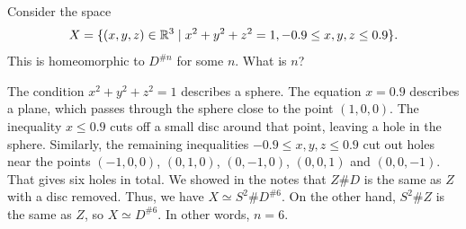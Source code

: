 \documentclass[a4paper]{amsart}
\begin{document}
\begin{exercise}
 Consider the space
 \[ X = \{(x,y,z)\in\mathbb{R}^3\;|\; x^2+y^2+z^2=1,
           -0.9 \leq x,y,z\leq 0.9\}.
 \]
 This is homeomorphic to $D^{\# n}$ for some $n$.  What is $n$?
\end{exercise}
\begin{solution}
 The condition $x^2+y^2+z^2=1$ describes a sphere.  The equation
 $x=0.9$ describes a plane, which passes through the sphere close to
 the point $(1,0,0)$.  The inequality $x\leq 0.9$ cuts off a small
 disc around that point, leaving a hole in the sphere.  Similarly, the
 remaining inequalities $-0.9\leq x,y,z\leq 0.9$ cut out holes near
 the points $(-1,0,0)$, $(0,1,0)$, $(0,-1,0)$, $(0,0,1)$ and
 $(0,0,-1)$.  That gives six holes in total.  We showed in the notes
 that $Z\# D$ is the same as $Z$ with a disc removed.  Thus, we have
 $X\simeq S^2\#D^{\# 6}$.  On the other hand, $S^2\# Z$ is the same as
 $Z$, so $X\simeq D^{\# 6}$.  In other words, $n=6$.
\end{solution}
\end{document}
